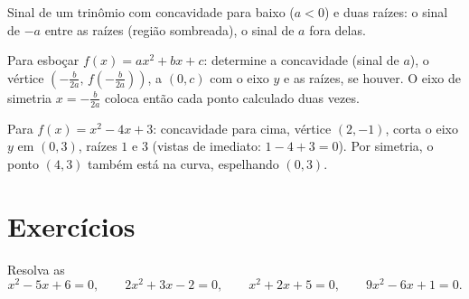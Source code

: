 \begin{omfigure}

{\small Sinal de um trinômio com concavidade para baixo ($a < 0$) e duas
raízes: o sinal de $-a$ entre as raízes (região sombreada), o sinal de
$a$ fora delas.}
\end{omfigure}

\begin{method}\label{met:g11:quad:reading}
Para esboçar $f(x) = ax^2+bx+c$: determine a concavidade (sinal de $a$),
o vértice $\left(-\frac{b}{2a},\, f\!\left(-\frac{b}{2a}\right)\right)$,
a  $(0, c)$ com o eixo $y$ e as raízes, se houver. O eixo de
simetria $x = -\frac{b}{2a}$ coloca então cada ponto calculado duas
vezes.
\end{method}

\begin{example}
Para $f(x) = x^2 - 4x + 3$: concavidade para cima, vértice $(2, -1)$,
corta o eixo $y$ em $(0,3)$, raízes $1$ e $3$ (vistas de imediato:
$1 - 4 + 3 = 0$). Por simetria, o ponto $(4, 3)$ também está na curva,
espelhando $(0, 3)$.
\end{example}

\section{Exercícios}

\begin{exercise}[$\star$]\label{exo:g11:quad:1}
Resolva as 
\[
x^2 - 5x + 6 = 0, \qquad
2x^2 + 3x - 2 = 0, \qquad
x^2 + 2x + 5 = 0, \qquad
9x^2 - 6x + 1 = 0 .
\]
\end{exercise}

